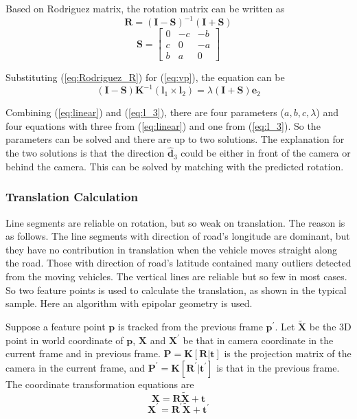 \documentclass[letterpaper, 10 pt, conference]{ieeeconf}  %
\begin{document}
Based on Rodriguez matrix, the rotation matrix can be written as
\begin{equation}
\mathbf{R}=\left(\mathbf{I}-\mathbf{S}\right)^{-1}\left(\mathbf{I}+\mathbf{S}\right)
\label{eq:Rodriguez_R}
\end{equation}
\begin{equation}
\mathbf{S}=\begin{bmatrix}      0 & -c & -b \\
                                c & 0 & -a \\
                                b & a & 0
                    \end{bmatrix}
\label{eq:Rodriguez_S}
\end{equation}

Substituting (\ref{eq:Rodriguez_R}) for (\ref{eq:vp}), the equation can be
\begin{equation}
(\mathbf{I}-\mathbf{S})\mathbf{K}^{-1}(\mathbf{l}_1\times \mathbf{l}_2) = \lambda (\mathbf{I}+\mathbf{S})\mathbf{e}_2
\label{eq:linear}
\end{equation}

Combining (\ref{eq:linear}) and (\ref{eq:l_3}), there are four parameters ($a,b,c,\lambda$) and four equations with three from (\ref{eq:linear}) and one from (\ref{eq:l_3}). So the parameters can be solved and there are up to two solutions. The explanation for the two solutions is that the direction $\hat{\mathbf{d}}_3$ could be either in front of the camera or behind the camera. This can be solved by matching with the predicted rotation.

\subsubsection{Translation Calculation}
Line segments are reliable on rotation, but so weak on translation. The reason is as follows. The line segments with direction of road's longitude are dominant, but they have no contribution in translation when the vehicle moves straight along the road. Those with direction of road's latitude contained many outliers detected from the moving vehicles. The vertical lines are reliable but so few in most cases. So two feature points is used to calculate the translation, as shown in the typical sample. Here an algorithm with epipolar geometry is used.

Suppose a feature point $\mathbf{p}$ is tracked from the previous frame $\mathbf{p}^\prime$. Let $\widetilde{\mathbf{X}}$ be the 3D point in world coordinate of $\mathbf{p}$, $\mathbf{X}$ and $\mathbf{X}^\prime$ be that in camera coordinate in the current frame and in previous frame. $\mathbf{P}=\mathbf{K}[\mathbf{R}|\mathbf{t}]$ is the projection matrix of the camera in the current frame, and $\mathbf{P}^\prime=\mathbf{K}[\mathbf{R}^\prime|\mathbf{t}^\prime]$ is that in the previous frame. The coordinate transformation equations are
\begin{equation}
\mathbf{X}    =\mathbf{R}       \widetilde{\mathbf{X}}+\mathbf{t}
\end{equation}
\begin{equation}
\mathbf{X}^\prime=\mathbf{R}^\prime   \widetilde{\mathbf{X}}+\mathbf{t}^\prime
\end{equation}
\end{document}
